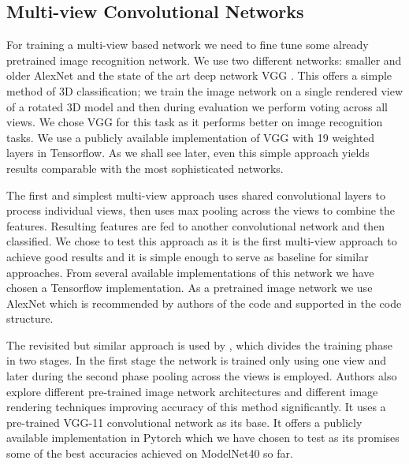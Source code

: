 \subsection{Multi-view Convolutional Networks}
For training a multi-view based network we need to fine tune some already pretrained image recognition network. We use two different networks: smaller and older AlexNet \cite{krizhevsky_imagenet_2012} and the state of the art deep network VGG \cite{simonyan_very_2014}. This offers a simple method of 3D classification; we train the image network on a single rendered view of a rotated 3D model and then during evaluation we perform voting across all views. We chose VGG for this task as it performs better on image recognition tasks. We use a publicly available implementation of VGG \cite{machrisaa_tensorflow-vgg_nodate} with 19 weighted layers in Tensorflow. As we shall see later, even this simple approach yields results comparable with the most sophisticated networks.
\par
The first and simplest multi-view approach \cite{su_multi-view_2015} uses shared convolutional layers to process individual views, then uses max pooling across the views to combine the features. Resulting features are fed to another convolutional network and then classified. We chose to test this approach as it is the first multi-view approach to achieve good results and it is simple enough to serve as baseline for similar approaches. From several available implementations of this network we have chosen a Tensorflow implementation. As a pretrained image network we use AlexNet which is recommended by authors of the code and supported in the code structure. 
\par
The revisited but similar approach is used by \cite{su_deeper_2018}, which divides the training phase in two stages. In the first stage the network is trained only using one view and later during the second phase pooling across the views is employed. Authors also explore different pre-trained image network architectures and different image rendering techniques improving accuracy of this method significantly. It uses a pre-trained VGG-11 convolutional network as its base. It offers a publicly available implementation in Pytorch which we have chosen to test as its promises some of the best accuracies achieved on ModelNet40 so far.



